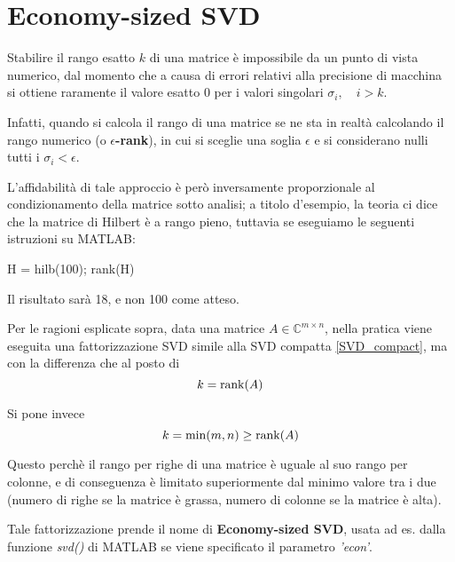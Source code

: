 \section{Economy-sized SVD}
\label{sec:SVD_econ}
Stabilire il rango esatto $k$ di una matrice è impossibile da un punto di vista 
numerico, dal momento che a causa di errori relativi alla precisione di macchina 
si ottiene raramente il valore esatto 0 per i valori singolari $\sigma_i, \quad 
i > k$.

Infatti, quando si calcola il rango di una matrice se ne sta in realtà 
calcolando il rango numerico (o \textbf{$\epsilon$-rank}), in cui si sceglie una 
soglia $\epsilon$ e si considerano nulli tutti i $\sigma_i < \epsilon$.

L'affidabilità di tale approccio è però inversamente proporzionale al 
condizionamento della matrice sotto analisi; a titolo d'esempio, la teoria ci 
dice che la matrice di Hilbert è a rango pieno, tuttavia se eseguiamo le 
seguenti istruzioni su MATLAB:

\begin{programma}
H = hilb(100);
rank(H)
\end{programma}

Il risultato sarà 18, e non 100 come atteso.

Per le ragioni esplicate sopra, data una matrice $A \in \mathbb{C}^{m \times 
n}$, nella pratica viene eseguita una fattorizzazione SVD simile alla SVD 
compatta \eqref{SVD_compact}, ma con la differenza che al posto di
\begin{equation*}
k = \operatorname{rank}(A)
\end{equation*}

Si pone invece
\begin{equation*}
k = \min(m,n) \geq \operatorname{rank}(A)
\end{equation*}

Questo perchè il rango per righe di una matrice è uguale al suo rango per 
colonne, e di conseguenza è limitato superiormente dal minimo valore tra i due 
(numero di righe se la matrice è grassa, numero di colonne se la matrice è 
alta).

Tale fattorizzazione prende il nome di \textbf{Economy-sized SVD}, usata ad es. 
dalla funzione \textit{svd()} di MATLAB se viene specificato il parametro 
\textit{'econ'}.
